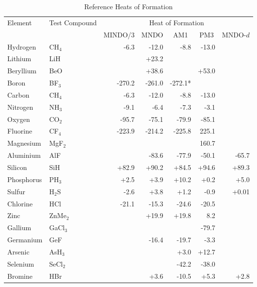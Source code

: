 \begin{table}
\caption{\label{hofr} Reference Heats of Formation}
\begin{center}
\begin{tabular}{llrrrrr}
\hline
Element & Test Compound & \multicolumn{5}{c}{Heat of Formation} \\
\cline{3-7} & & \multicolumn{1}{c}{MINDO/3} & \multicolumn{1}{c}{MNDO} &
\multicolumn{1}{c}{AM1} & \multicolumn{1}{c}{PM3} & \multicolumn{1}{c}{MNDO-$d$} \\
\hline
Hydrogen   & CH$_4$    &      -6.3  & -12.0&  -8.8 &-13.0  \\
Lithium    & LiH       &            & +23.2&      &  \\
Beryllium  & BeO       &            & +38.6&       &+53.0   \\
Boron      & BF$_3$    &    -270.2  &-261.0&-272.1*&  \\
Carbon     & CH$_4$    &      -6.3  & -12.0&  -8.8 &-13.0  \\
Nitrogen   & NH$_3$    &      -9.1  &  -6.4&  -7.3 & -3.1  \\
Oxygen     & CO$_2$    &     -95.7  & -75.1& -79.9 &-85.1  \\
Fluorine   & CF$_4$    &    -223.9  &-214.2&-225.8 &225.1  \\
Magnesium  & MgF$_2$   &            &      &       &160.7  \\
Aluminium  & AlF       &            & -83.6& -77.9 &-50.1 &-65.7 \\
Silicon    & SiH       &     +82.9  & +90.2& +84.5 &+94.6 & +89.3 \\
Phosphorus & PH$_3$    &      +2.5  &  +3.9& +10.2 & +0.2& +5.0 \\
Sulfur     & H$_2$S    &      -2.6  &  +3.8&  +1.2 & -0.9& +0.01  \\
Chlorine   & HCl       &     -21.1  & -15.3& -24.6 &-20.5  \\
Zinc       & ZnMe$_2$  &            & +19.9& +19.8 &  8.2  \\
Gallium    & GaCl$_3$  &            &      &       &-79.7  \\
Germanium  & GeF       &            & -16.4& -19.7 & -3.3  \\
Arsenic    & AsH$_3$   &            &      & +3.0  &+12.7  \\
Selenium   & SeCl$_2$  &            &      & -42.2 &-38.0  \\
Bromine    & HBr       &            &  +3.6& -10.5 & +5.3  & +2.8 \\

\end{tabular}
\end{center}
\end{table}
